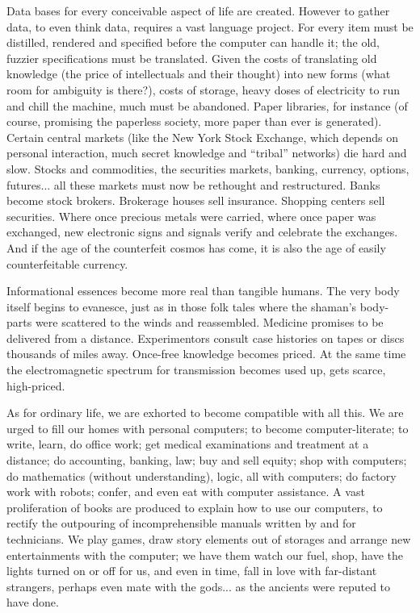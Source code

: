 Data bases for every conceivable aspect of life are created. However to gather data, to even think
data, requires a vast language project. For every item must be distilled, rendered and specified
before the computer can handle it; the old, fuzzier specifications must be translated. Given the
costs of translating old knowledge (the price of intellectuals and their thought) into new forms
(what room for ambiguity is there?), costs of storage, heavy doses of electricity to run and chill
the machine, much must be abandoned. Paper libraries, for instance (of course, promising the
paperless society, more paper than ever is generated). Certain central markets (like the New York
Stock Exchange, which depends on personal interaction, much secret knowledge and \enquote{tribal}
networks) die hard and slow. Stocks and commodities, the securities markets, banking, currency,
options, futures... all these markets must now be rethought and restructured. Banks become stock
brokers. Brokerage houses sell insurance. Shopping centers sell securities. Where once precious
metals were carried, where once paper was exchanged, new electronic signs and signals verify and
celebrate the exchanges. And if the age of the counterfeit cosmos has come, it is also the age of
easily counterfeitable currency. 

Informational essences become more real than tangible humans. The very body itself begins to
evanesce, just as in those folk tales where the shaman's body-parts were scattered to the winds and
reassembled. Medicine promises to be delivered from a distance. Experimentors consult case histories
on tapes or discs thousands of miles away. Once-free knowledge becomes priced. At the same time the
electromagnetic spectrum for transmission becomes used up, gets scarce, high-priced. 

As for ordinary life, we are exhorted to become compatible with all this. We are urged to fill our
homes with personal computers; to become computer-literate; to write, learn, do office work; get
medical examinations and treatment at a distance; do accounting, banking, law; buy and sell equity;
shop with computers; do mathematics (without understanding), logic, all with computers; do factory
work with robots; confer, and even eat with computer assistance. A vast proliferation of books are
produced to explain how to use our computers, to rectify the outpouring of incomprehensible manuals
written by and for technicians. We play games, draw story elements out of storages and arrange new
entertainments with the computer; we have them watch our fuel, shop, have the lights turned on or
off for us, and even in time, fall in love with far-distant strangers, perhaps even mate with the
gods... as the ancients were reputed to have done. 

